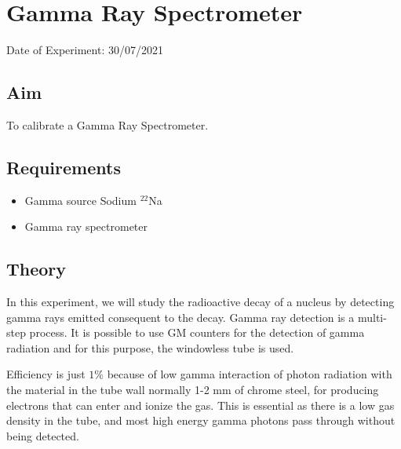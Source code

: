 


	
	\chapter{Gamma Ray Spectrometer} %
	\vspace{-1cm}
	
	\begin{center}%
		Date of Experiment: 30/07/2021
	\end{center}
	
	
	\section{Aim}
	To calibrate a Gamma Ray Spectrometer.
	
	\section{Requirements}
	\begin{itemize}
		\item	Gamma source Sodium $ ^{22} $Na
		\item 	Gamma ray spectrometer
	\end{itemize}
	
	\section{Theory}
	In this experiment, we will study the radioactive decay of a nucleus by detecting gamma rays emitted consequent to the decay. Gamma ray detection is a multi-step process. It is possible to use GM counters for the detection of gamma radiation and for this purpose, the windowless tube is used. 
	
	Efficiency is just $ 1\% $ because of low gamma interaction of photon radiation with the material in the tube wall normally 1-2 mm of chrome steel, for producing electrons that can enter and ionize the gas. This is essential as there is a low gas density in the tube, and most high energy gamma photons pass through without being detected. 
		
